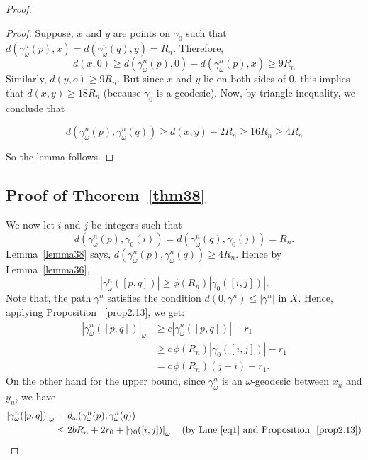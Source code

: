 \documentclass[12 pt]{amsart}
\theoremstyle{definition}
\theoremstyle{remark}
\begin{document}
\begin{proof}
\begin{proof}
Suppose, $x$ and $y$ are points on $\gamma_{0}$ such that $d\left(\gamma_{\omega}^{n}(p), x\right)=d\left(\gamma_{\omega}^{n}(q), y\right)=R_{n}$. \newline Therefore, \[d(x,\mathfrak{0})\geq d(\gamma_{\omega}^{n}(p),\mathfrak{0})-d(\gamma_{\omega}^{n}(p),x)\geq 9R_n \] Similarly, $d(y, o) \geq 9 R_{n}$. But since $x$ and $y$ lie on both sides of $\mathfrak{0}$, this implies that $d(x, y) \geq 18 R_{n}$ (because $\gamma_{0}$ is a geodesic). Now, by triangle inequality, we conclude that

$$
d\left(\gamma_{\omega}^{n}(p), \gamma_{\omega}^{n}(q)\right) \geq d(x, y)-2 R_{n} \geq 16 R_{n} \geq 4 R_{n}
$$

So the lemma follows.
\end{proof}

\subsection*{Proof of Theorem~\ref{thm38}}
We now let $i$ and $j$ be integers such that
\begin{equation} \label{eq1}
d\left(\gamma_{\omega}^{n}(p), \gamma_{0}(i)\right) = d\left(\gamma_{\omega}^{n}(q), \gamma_{0}(j)\right) = R_{n}.
\end{equation}
Lemma~\ref{lemma38} says, $d\left(\gamma_{\omega}^{n}(p), \gamma_{\omega}^{n}(q)\right) \geq 4R_{n}$. Hence by Lemma~\ref{lemma36}, 
\[
\left|\gamma_{\omega}^{n}([p, q])\right| \geq \phi\left(R_{n}\right)\left|\gamma_{0}([i, j])\right|.
\]
Note that, the path \(\gamma^n\) satisfies the condition \(d(\mathfrak{0}, \gamma^n) \leq |\gamma^n|\) in \(X\). Hence, applying Proposition ~\ref{prop2.13}, we get:
\[
\begin{aligned}
\left|\gamma_{\omega}^{n}([p, q])\right|_{\omega}
& \geq c \left|\gamma_{\omega}^{n}([p, q])\right| - r_{1} \\
& \geq c\, \phi\left(R_{n}\right)\left|\gamma_{0}([i, j])\right| - r_{1} \\
& = c\, \phi\left(R_{n}\right)(j - i) - r_{1}.
\end{aligned}
\]
On the other hand for the upper bound, since \(\gamma_{\omega}^{n}\) is an \(\omega\)-geodesic between \(x_{n}\) and \(y_{n}\), we have
\[
\begin{aligned}
\left|\gamma_{\omega}^{n}([p, q])\right|_{\omega}
&= d_\omega(\gamma_\omega^n(p), \gamma_\omega^n(q))\\
& \leq 2bR_{n} +2r_0+ \left|\gamma_{0}([i, j])\right|_{\omega} \quad \text{(by Line~\ref{eq1} and Proposition ~\ref{prop2.13})} \\

\end{aligned}\]
\end{proof}
\end{document}
